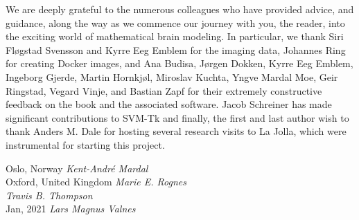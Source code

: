 We are deeply grateful to the numerous colleagues who have provided
advice, and guidance, along the way as we commence our journey with
you, the reader, into the exciting world of mathematical brain
modeling. In particular, we thank Siri Fl\o gstad Svensson and Kyrre
Eeg Emblem for the imaging data, Johannes Ring for creating Docker
images, and Ana Budisa, J\o rgen Dokken, Kyrre Eeg Emblem, Ingeborg
Gjerde, Martin Hornkj\o l, Miroslav Kuchta, Yngve Mardal Moe, Geir
Ringstad, Vegard Vinje, and Bastian Zapf for their extremely
constructive feedback on the book and the associated software. 
Jacob Schreiner has made significant contributions to SVM-Tk and
finally, the first and last author wish to thank 
Anders M. Dale for hosting several research visits to La Jolla, 
which were instrumental for starting this project. 


\vspace{\baselineskip}
\begin{flushright}\noindent
Oslo, Norway \hfill {\it Kent-Andr\'e Mardal}\\ 
Oxford, United Kingdom   \hfill {\it Marie E. Rognes}\\ 
             \hfill {\it Travis B. Thompson}\\ 
Jan, 2021    \hfill {\it Lars Magnus Valnes}\\ 
\end{flushright}


